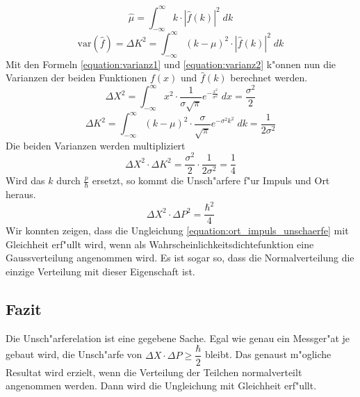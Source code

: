\begin{refsection}
\begin{equation}
	\hat{\mu} = \int_{-\infty}^{\infty} k \cdot  |\hat{f}(k)|^{2}\; dk
\end{equation}
\begin{equation}	
	\text{var}(\hat{f}) = \varDelta K^{2}  = \int_{-\infty}^{\infty} (k-\mu)^{2} \cdot  |\hat{f}(k)|^{2} \; dk
	\label{equation:varianz2}
\end{equation}
Mit den Formeln \ref{equation:varianz1} und \ref{equation:varianz2} k"onnen nun die Varianzen der beiden Funktionen $f(x)$ und $\hat{f}(k)$ berechnet werden.
\begin{equation}	
	\varDelta X^{2} = \int_{-\infty}^{\infty} x^{2} \cdot \dfrac{1}{\sigma \sqrt{\pi}}e^{-\frac{x^{2}}{\sigma^{2}}} \; dx = \frac{\sigma^{2}}{2}
\end{equation}
\begin{equation}	
	\varDelta K^{2} = \int_{-\infty}^{\infty} (k-\mu)^{2} \cdot  \dfrac{\sigma}{\sqrt{\pi} }e^{-\sigma^{2} k^{2}} \; dk = \dfrac{1}{2\sigma^{2}}
\end{equation}
Die beiden Varianzen werden multipliziert
\begin{equation}	
	\varDelta X^{2} \cdot \varDelta K^{2} = \frac{\sigma^{2}}{2} \cdot \dfrac{1}{2\sigma^{2}} = \dfrac{1}{4}
\end{equation}
Wird das $k$ durch $\frac{p}{\hbar}$ ersetzt, so kommt die Unsch"arfere f"ur Impuls und Ort heraus.
\begin{equation}	
	\varDelta X^{2} \cdot \varDelta P^{2} = \dfrac{\hbar^{2}}{4}
\end{equation}
Wir konnten zeigen, dass die Ungleichung \ref{equation:ort_impuls_unschaerfe} mit Gleichheit erf"ullt wird, wenn als Wahrscheinlichkeitsdichtefunktion eine Gaussverteilung angenommen wird.
Es ist sogar so, dass die Normalverteilung die einzige Verteilung mit dieser Eigenschaft ist.

\subsection{Fazit}

Die Unsch"arferelation ist eine gegebene Sache. Egal wie genau ein Messger"at je gebaut wird, die Unsch"arfe von $\varDelta X \cdot \varDelta P \geq \dfrac{\hbar}{2}$ bleibt. Das genaust m"ogliche Resultat wird erzielt, wenn die Verteilung der Teilchen normalverteilt angenommen werden. Dann wird die Ungleichung mit Gleichheit erf"ullt.

\printbibliography[heading=subbibliography]
\end{refsection}

